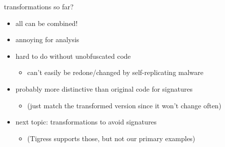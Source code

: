\begin{frame}{transformations so far?}
    \begin{itemize}
    \item all can be combined!
    \item annoying for analysis
    \item hard to do without unobfuscated code
        \begin{itemize}
        \item can't easily be redone/changed by self-replicating malware
        \end{itemize}
    \item probably more distinctive than original code for signatures
        \begin{itemize}
        \item (just match the transformed version since it won't change often)
        \end{itemize}
    \vspace{.5cm}
    \item next topic: transformations to avoid signatures
        \begin{itemize}
        \item (Tigress supports those, but not our primary examples)
        \end{itemize}
    \end{itemize}
\end{frame}
